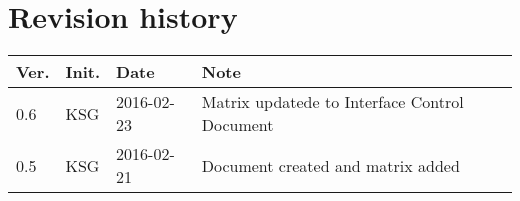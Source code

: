 \chapter*{Revision history}
\label{app:rev_his}


\begin{tabular}{b{1cm} b{1cm} b{2cm} b{8cm}}
    \textbf{Ver.} & \textbf{Init.} & \textbf{Date} & \textbf{Note} \\
    \hline
    0.6 & KSG & 2016-02-23 & Matrix updatede to Interface Control Document\\
    0.5 & KSG & 2016-02-21 & Document created and matrix added \\
\end{tabular}
